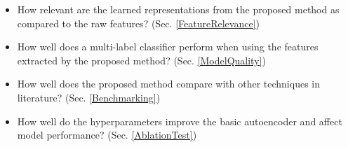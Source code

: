 \begin{itemize}
    \item How relevant are the learned representations from the proposed method
        as compared to the raw features? (Sec. \ref{FeatureRelevance})
    \item How well does a multi-label classifier perform when using the
        features extracted by the proposed method? (Sec. \ref{ModelQuality})
    \item How well does the proposed method compare with other techniques in
        literature? (Sec. \ref{Benchmarking})
    \item How well do the hyperparameters improve the basic autoencoder and
        affect model performance? (Sec. \ref{AblationTest})
\end{itemize}

